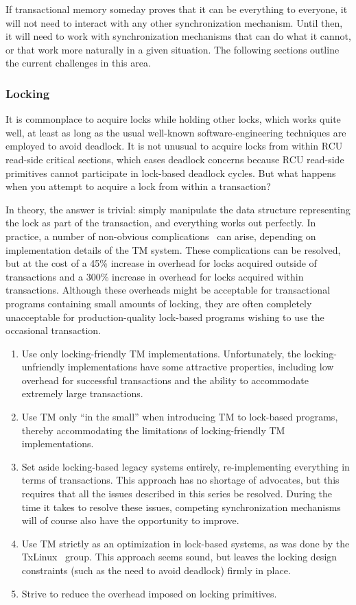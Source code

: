 If transactional memory someday proves that it can be everything to everyone,
it will not need to interact with any other synchronization mechanism.
Until then, it will need to work with synchronization mechanisms that
can do what it cannot, or that work more naturally in a given situation.
The following sections outline the current challenges in this area.

\subsubsection{Locking}
\label{sec:future:Locking}

It is commonplace to acquire locks while holding other locks, which works
quite well, at least as long as the usual well-known software-engineering
techniques are employed to avoid deadlock.
It is not unusual to acquire locks from within RCU read-side critical
sections, which eases deadlock concerns because RCU read-side primitives
cannot participate in lock-based deadlock cycles.
But what happens when you attempt to acquire a lock from within a transaction?

In theory, the answer is trivial: simply manipulate the data structure
representing the lock as part of the transaction, and everything works
out perfectly.
In practice, a number of non-obvious complications~\cite{Volos2008TRANSACT}
can arise, depending on implementation details of the TM system.
These complications can be resolved, but at the cost of a 45\% increase in
overhead for locks acquired outside of transactions and a 300\% increase
in overhead for locks acquired within transactions.
Although these overheads might be acceptable for transactional
programs containing small amounts of locking, they are often completely
unacceptable for production-quality lock-based programs wishing to use
the occasional transaction.

\begin{enumerate}
\item	Use only locking-friendly TM implementations.
	Unfortunately, the locking-unfriendly implementations have some
	attractive properties, including low overhead for successful
	transactions and the ability to accommodate extremely large
	transactions.
\item	Use TM only ``in the small'' when introducing TM to lock-based
	programs, thereby accommodating the limitations of
	locking-friendly TM implementations.
\item	Set aside locking-based legacy systems entirely, re-implementing
	everything in terms of transactions.
	This approach has no shortage of advocates, but this requires
	that all the issues described in this series be resolved.
	During the time it takes to resolve these issues, competing
	synchronization mechanisms will of course also have the
	opportunity to improve.
\item	Use TM strictly as an optimization in lock-based systems, as was
	done by the TxLinux~\cite{ChistopherJRossbach2007a} group.
	This approach seems sound, but leaves the locking design
	constraints (such as the need to avoid deadlock) firmly in place.
\item	Strive to reduce the overhead imposed on locking primitives.
\end{enumerate}

